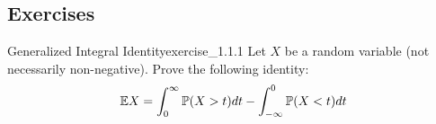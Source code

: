 \noindent\subsection*{Exercises}
\begin{exercise}{Generalized Integral Identity}{exercise_1.1.1}
    Let $X$ be a random variable (not necessarily non-negative). Prove the following identity:
    \begin{align}
        \mathbb{E} X = \int_0^\infty \mathbb{P}(X > t)dt - \int_{-\infty}^0 \mathbb{P} (X<t)dt
    \end{align}
\end{exercise}

\begin{solution*}

\end{solution*}
